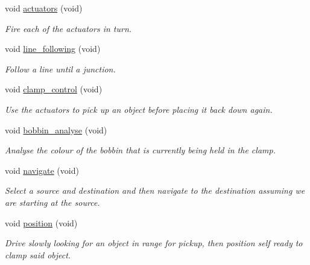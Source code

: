 \begin{DoxyCompactItemize}
void \hyperlink{classIDP_1_1SelfTests_a0ca765ac144fafaab502f4326a480486}{actuators} (void)
\begin{DoxyCompactList}\small\item\em Fire each of the actuators in turn. \item\end{DoxyCompactList}\item 
void \hyperlink{classIDP_1_1SelfTests_a0a1a40b56fee5249def567bebdb05dc1}{line\_\-following} (void)
\begin{DoxyCompactList}\small\item\em Follow a line until a junction. \item\end{DoxyCompactList}\item 
void \hyperlink{classIDP_1_1SelfTests_a896204355ca039660a12e8131578b6c3}{clamp\_\-control} (void)
\begin{DoxyCompactList}\small\item\em Use the actuators to pick up an object before placing it back down again. \item\end{DoxyCompactList}\item 
void \hyperlink{classIDP_1_1SelfTests_a66f0a3bad277e36b963b2bf3cd5df9dd}{bobbin\_\-analyse} (void)
\begin{DoxyCompactList}\small\item\em Analyse the colour of the bobbin that is currently being held in the clamp. \item\end{DoxyCompactList}\item 
void \hyperlink{classIDP_1_1SelfTests_a710347081427c05706f92bdd12f62fbe}{navigate} (void)
\begin{DoxyCompactList}\small\item\em Select a source and destination and then navigate to the destination assuming we are starting at the source. \item\end{DoxyCompactList}\item 
void \hyperlink{classIDP_1_1SelfTests_ada3dfe991573fc6b0922cace927fc4e0}{position} (void)
\begin{DoxyCompactList}\small\item\em Drive slowly looking for an object in range for pickup, then position self ready to clamp said object. \item\end{DoxyCompactList}\item 

\end{DoxyCompactItemize}
